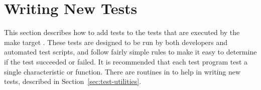 \ifx\insingle\undefined
\else
\let\subsubsection=\subsection
\let\subsection=\section
\fi

\subsection{Writing New Tests}
\label{sec:new-tests}
This section describes how to add tests to the tests that are executed
by the make target .  These tests are designed to be run
by both developers and automated test scripts, and follow fairly
simple rules to make it easy to determine if the test succeeded or
failed.  It is recommended that each test program test a single
characteristic or function.  There are routines in
 to help in writing new tests, described
in Section~\ref{sec:test-utilities}.

